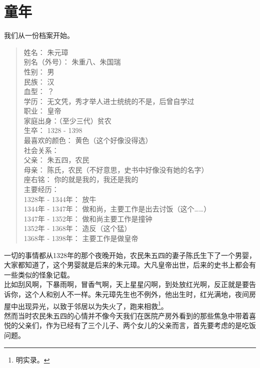 \section{童年}
\ifnum{}
	\begin{multicols}{\theparacolNo}
\fi
我们从一份档案开始。
{\footnotesize \begin{quote}
	姓名： 朱元璋\\
	别名（外号）： 朱重八、朱国瑞\\
	性别： 男\\
	民族： 汉\\
	血型： ？\\
	学历： 无文凭，秀才举人进士统统的不是，后曾自学过\\
	职业： 皇帝\\
	家庭出身：（至少三代）贫农\\
	生卒： 1328 - 1398\\
	最喜欢的颜色： 黄色（这个好像没得选）\\

	社会关系：\\
	父亲： 朱五四，农民\\
	母亲： 陈氏，农民（不好意思，史书中好像没有她的名字）\\
	座右铭： 你的就是我的，我还是我的\\

	主要经历：\\
	1328年 - 1344年： 放牛\\
	1344年 - 1347年： 做和尚，主要工作是出去讨饭（这个……）\\
	1347年 - 1352年： 做和尚主要工作是撞钟\\
	1352年 - 1368年： 造反（这个猛）\\
	1368年 - 1398年： 主要工作是做皇帝\\
\end{quote}}

一切的事情都从1328年的那个夜晚开始，农民朱五四的妻子陈氏生下了一个男婴，大家都知道了，这个男婴就是后来的朱元璋。大凡皇帝出世，后来的史书上都会有一些类似的怪象记载。\\

比如刮风啊，下暴雨啊，冒香气啊，天上星星闪啊，到处放红光啊，反正就是要告诉你，这个人和别人不一样。朱元璋先生也不例外，他出生时，红光满地，夜间房屋中出现异光，以致于邻居以为失火了，跑来相救\footnote{明实录。}。\\

然而当时农民朱五四的心情并不像今天我们在医院产房外看到的那些焦急中带着喜悦的父亲们，作为已经有了三个儿子、两个女儿的父亲而言，首先要考虑的是吃饭问题。\\


\end{multicols}
